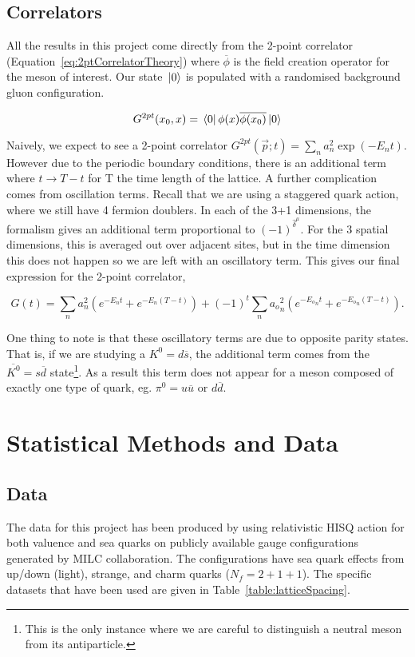 \documentclass[a4paper,12pt]{article}
\begin{document}
\subsection{Correlators}
All the results in this project come directly from the 2-point correlator (Equation~\ref{eq:2ptCorrelatorTheory}) where $\overline{\phi}$ is the field creation operator for the meson of interest. Our state $\ket*{0}$ is populated with a randomised background gluon configuration.

\begin{equation}
    \label{eq:2ptCorrelatorTheory}
    G^{2pt}(x_0, x) = \bra*{0}\phi(x)\overline{\phi(x_0)}\ket*{0}
\end{equation}

Naively, we expect\cite{2016Chakraborty} to see a 2-point correlator $G^{2pt}(\overrightarrow{p}; t) = \sum_n a_n^2 \exp(-E_n t)$. However due to the periodic boundary conditions, there is an additional term where $t \rightarrow T-t$ for T the time length of the lattice. A further complication comes from oscillation terms. Recall that we are using a staggered quark action, where we still have 4 fermion doublers. In each of the 3+1 dimensions, the formalism gives an additional term proportional to ${(-1)}^{\hat{\delta}^\mu}$. For the 3 spatial dimensions, this is averaged out over adjacent sites, but in the time dimension this does not happen so we are left with an oscillatory term. This gives our final expression for the 2-point correlator,

\begin{equation}
    \label{eq:2ptCorrelator}
    G(t) = \sum_n a_n^2 (e^{-E_n t} + e^{-E_n(T-t)}) + {(-1)}^t \sum_n {a_o}_n^2 (e^{-{E_o}_n t} + e^{{-E_o}_n (T-t)}).
\end{equation}

One thing to note is that these oscillatory terms are due to opposite parity states. That is, if we are studying a $K^0=d \overline{s}$, the additional term comes from the $\overline{K^0}=s\overline{d}$ state\footnote{This is the only instance where we are careful to distinguish a neutral meson from its antiparticle.}. As a result this term does not appear for a meson composed of exactly one type of quark, eg. $\pi^0 = u\overline{u}$ or $d\overline{d}$.

\section{Statistical Methods and Data}
\subsection{Data}
The data for this project has been produced by using relativistic HISQ action for both valuence and sea quarks on publicly available gauge configurations generated by MILC collaboration\cite{bazavov2013lattice}. The configurations have sea quark effects from up/down (light), strange, and charm quarks ($N_f = 2+1+1$). The specific datasets that have been used are given in Table~\ref{table:latticeSpacing}.
\end{document}
